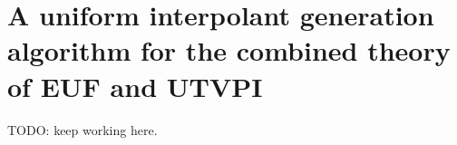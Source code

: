 \section{A uniform interpolant generation algorithm for the 
combined theory of EUF and UTVPI}

TODO: keep working here.

